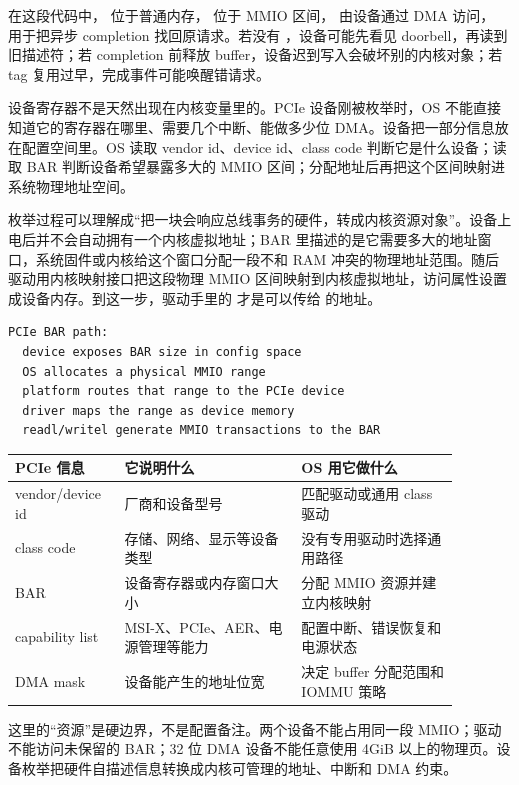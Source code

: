 在这段代码中， 位于普通内存， 位于 MMIO 区间， 由设备通过 DMA 访问， 用于把异步 completion 找回原请求。若没有 ，设备可能先看见 doorbell，再读到旧描述符；若 completion 前释放 buffer，设备迟到写入会破坏别的内核对象；若 tag 复用过早，完成事件可能唤醒错请求。

设备寄存器不是天然出现在内核变量里的。PCIe 设备刚被枚举时，OS 不能直接知道它的寄存器在哪里、需要几个中断、能做多少位 DMA。设备把一部分信息放在配置空间里。OS 读取 vendor id、device id、class code 判断它是什么设备；读取 BAR 判断设备希望暴露多大的 MMIO 区间；分配地址后再把这个区间映射进系统物理地址空间。

枚举过程可以理解成“把一块会响应总线事务的硬件，转成内核资源对象”。设备上电后并不会自动拥有一个内核虚拟地址；BAR 里描述的是它需要多大的地址窗口，系统固件或内核给这个窗口分配一段不和 RAM 冲突的物理地址范围。随后驱动用内核映射接口把这段物理 MMIO 区间映射到内核虚拟地址，访问属性设置成设备内存。到这一步，驱动手里的  才是可以传给  的地址。

\begin{lstlisting}
PCIe BAR path:
  device exposes BAR size in config space
  OS allocates a physical MMIO range
  platform routes that range to the PCIe device
  driver maps the range as device memory
  readl/writel generate MMIO transactions to the BAR
\end{lstlisting}

\begin{longtable}{p{0.2\linewidth}p{0.36\linewidth}p{0.32\linewidth}}
\toprule
PCIe 信息 & 它说明什么 & OS 用它做什么 \\
\midrule
vendor/device id & 厂商和设备型号 & 匹配驱动或通用 class 驱动 \\
class code & 存储、网络、显示等设备类型 & 没有专用驱动时选择通用路径 \\
BAR & 设备寄存器或内存窗口大小 & 分配 MMIO 资源并建立内核映射 \\
capability list & MSI-X、PCIe、AER、电源管理等能力 & 配置中断、错误恢复和电源状态 \\
DMA mask & 设备能产生的地址位宽 & 决定 buffer 分配范围和 IOMMU 策略 \\
\bottomrule
\end{longtable}

这里的“资源”是硬边界，不是配置备注。两个设备不能占用同一段 MMIO；驱动不能访问未保留的 BAR；32 位 DMA 设备不能任意使用 4GiB 以上的物理页。设备枚举把硬件自描述信息转换成内核可管理的地址、中断和 DMA 约束。

